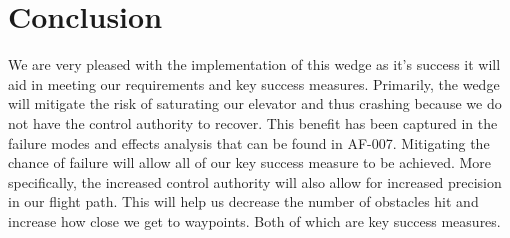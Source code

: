 \documentclass[]{auvsi_doc}
\begin{document}
\section{Conclusion}

We are very pleased with the implementation of this wedge as it's success it will aid in meeting our requirements and key success measures. Primarily, the wedge will mitigate the risk of saturating our elevator and thus crashing because we do not have the control authority to recover. This benefit has been captured in the failure modes and effects analysis that can be found in AF-007. Mitigating the chance of failure will allow all of our key success measure to be achieved. More specifically, the increased control authority will also allow for increased precision in our flight path. This will help us decrease the number of obstacles hit and increase how close we get to waypoints. Both of which are key success measures.
\end{document}
